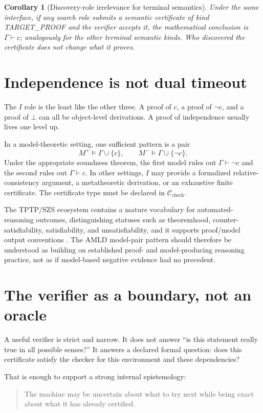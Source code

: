 \documentclass[11pt,openany]{book}
\newtheorem{corollary}[theorem]{Corollary}
\theoremstyle{definition}
\theoremstyle{remark}
\newcommand{\botc}{\bot}
\begin{document}
\begin{corollary}[Discovery-role irrelevance for terminal semantics]\label{cor:discoveryirrelevance}
Under the same interface, if any search role submits a semantic certificate of kind \textsf{TARGET\_PROOF} and the verifier accepts it, the mathematical conclusion is $\Gamma\vdash c$; analogously for the other terminal semantic kinds. Who discovered the certificate does not change what it proves.
\end{corollary}


\section{Independence is not dual timeout}
The $I$ role is the least like the other three. A proof of $c$, a proof of $\neg c$, and a proof of $\botc$ can all be object-level derivations. A proof of independence usually lives one level up.

In a model-theoretic setting, one sufficient pattern is a pair
\[
M^+\models\Gamma\cup\{c\},
\qquad
M^-\models\Gamma\cup\{\neg c\}.
\]
Under the appropriate soundness theorem, the first model rules out $\Gamma\vdash\neg c$ and the second rules out $\Gamma\vdash c$. In other settings, $I$ may provide a formalized relative-consistency argument, a metatheoretic derivation, or an exhaustive finite certificate. The certificate type must be declared in $\mathcal C_{\mathrm{check}}$.

The TPTP/SZS ecosystem contains a mature vocabulary for automated-reasoning outcomes, distinguishing statuses such as theoremhood, counter-satisfiability, satisfiability, and unsatisfiability, and it supports proof/model output conventions \cite{TPTPQuick,TPTPLanguage}. The AMLD model-pair pattern should therefore be understood as building on established proof- and model-producing reasoning practice, not as if model-based negative evidence had no precedent.

\section{The verifier as a boundary, not an oracle}
A useful verifier is strict and narrow. It does not answer ``is this statement really true in all possible senses?'' It answers a declared formal question: does this certificate satisfy the checker for this environment and these dependencies?

That is enough to support a strong internal epistemology:
\begin{quote}
The machine may be uncertain about what to try next while being exact about what it has already certified.
\end{quote}
\end{document}
